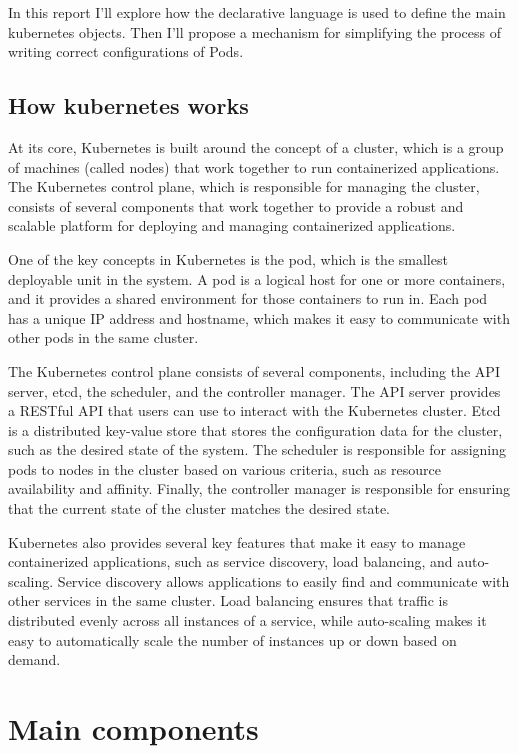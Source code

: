 \documentclass[
  11pt,
]{article}
\begin{document}
In this report I'll explore how the declarative language is used to
define the main kubernetes objects. Then I'll propose a mechanism for
simplifying the process of writing correct configurations of Pods.

\hypertarget{how-kubernetes-works}{%
\subsection{How kubernetes works}\label{how-kubernetes-works}}

At its core, Kubernetes is built around the concept of a cluster, which
is a group of machines (called nodes) that work together to run
containerized applications. The Kubernetes control plane, which is
responsible for managing the cluster, consists of several components
that work together to provide a robust and scalable platform for
deploying and managing containerized applications.

One of the key concepts in Kubernetes is the pod, which is the smallest
deployable unit in the system. A pod is a logical host for one or more
containers, and it provides a shared environment for those containers to
run in. Each pod has a unique IP address and hostname, which makes it
easy to communicate with other pods in the same cluster.

The Kubernetes control plane consists of several components, including
the API server, etcd, the scheduler, and the controller manager. The API
server provides a RESTful API that users can use to interact with the
Kubernetes cluster. Etcd is a distributed key-value store that stores
the configuration data for the cluster, such as the desired state of the
system. The scheduler is responsible for assigning pods to nodes in the
cluster based on various criteria, such as resource availability and
affinity. Finally, the controller manager is responsible for ensuring
that the current state of the cluster matches the desired state.

Kubernetes also provides several key features that make it easy to
manage containerized applications, such as service discovery, load
balancing, and auto-scaling. Service discovery allows applications to
easily find and communicate with other services in the same cluster.
Load balancing ensures that traffic is distributed evenly across all
instances of a service, while auto-scaling makes it easy to
automatically scale the number of instances up or down based on demand.

\hypertarget{main-components}{%
\section{Main components}\label{main-components}}
\end{document}

